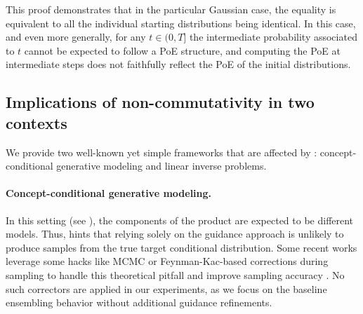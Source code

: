 \documentclass[10pt]{article} %
\begin{document}
This proof demonstrates that in the particular Gaussian case, the equality is equivalent to all the individual starting distributions being identical. 
In this case, and even more generally, for any $t\in(0,T]$ the intermediate probability associated to $t$ cannot be expected to follow a PoE structure, and computing the PoE at intermediate steps does not faithfully reflect the PoE of the initial distributions. 

\subsection{Implications of non-commutativity in two contexts} \label{app: implications of non commutativity}


We provide two well-known yet simple frameworks that are affected by : concept-conditional generative modeling and linear inverse problems.

\paragraph{Concept-conditional generative modeling.} In this setting (see ), the components of the product are expected to be different models. Thus,  hints that relying solely on the guidance approach is unlikely to produce samples from the true target conditional distribution. Some recent works leverage some hacks like MCMC or Feynman-Kac-based corrections during sampling to handle this theoretical pitfall and improve sampling accuracy \citep{du2023reducereuserecyclecompositional, skreta2025feynman}. No such correctors are applied in our experiments, as we focus on the baseline ensembling behavior without additional guidance refinements.
\end{document}
